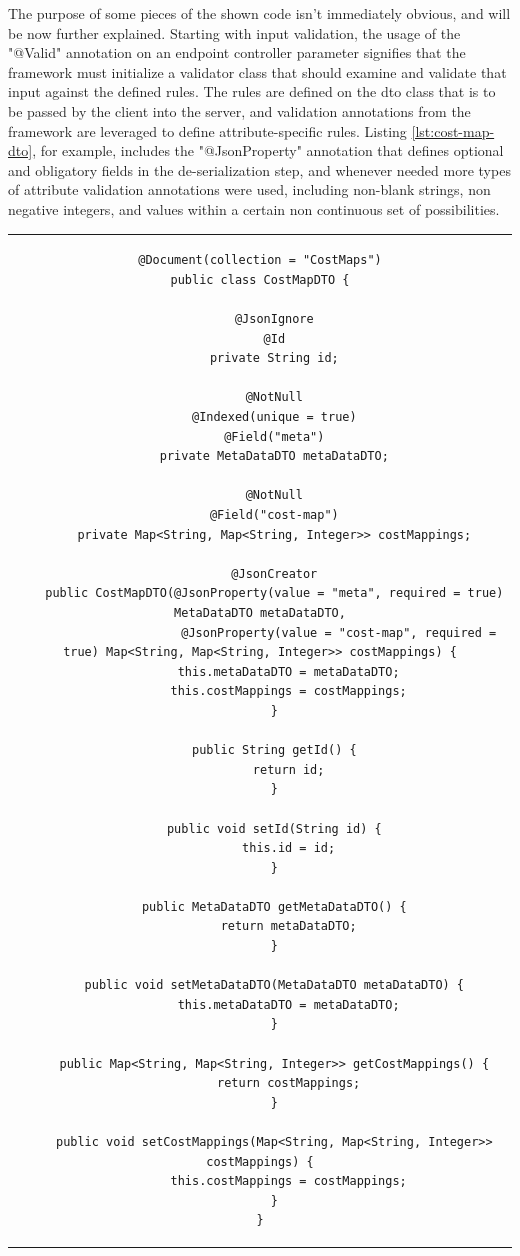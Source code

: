     The purpose of some pieces of the shown code isn't immediately obvious, and will be now further explained.
    Starting with input validation, the usage of the "@Valid" annotation on an endpoint controller parameter signifies that the framework must initialize a validator class that should examine and validate that input against the defined rules.
    The rules are defined on the \gls{dto} class that is to be passed by the client into the server, and validation annotations from the framework are leveraged to define attribute-specific rules.
    Listing \ref{lst:cost-map-dto}, for example, includes the "@JsonProperty" annotation that defines optional and obligatory fields in the de-serialization step, and whenever needed more types of attribute validation annotations were used, including non-blank strings, non negative integers, and values within a certain non continuous set of possibilities.

\begin{center}
\begin{tabular}{c}
\begin{lstlisting}[frame=tlrb, caption=Cost map DTO class, label={lst:cost-map-dto}, basicstyle=\tiny]
@Document(collection = "CostMaps")
public class CostMapDTO {

    @JsonIgnore
    @Id
    private String id;

    @NotNull
    @Indexed(unique = true)
    @Field("meta")
    private MetaDataDTO metaDataDTO;

    @NotNull
    @Field("cost-map")
    private Map<String, Map<String, Integer>> costMappings;

    @JsonCreator
    public CostMapDTO(@JsonProperty(value = "meta", required = true) MetaDataDTO metaDataDTO,
                      @JsonProperty(value = "cost-map", required = true) Map<String, Map<String, Integer>> costMappings) {
        this.metaDataDTO = metaDataDTO;
        this.costMappings = costMappings;
    }

    public String getId() {
        return id;
    }

    public void setId(String id) {
        this.id = id;
    }

    public MetaDataDTO getMetaDataDTO() {
        return metaDataDTO;
    }

    public void setMetaDataDTO(MetaDataDTO metaDataDTO) {
        this.metaDataDTO = metaDataDTO;
    }

    public Map<String, Map<String, Integer>> getCostMappings() {
        return costMappings;
    }

    public void setCostMappings(Map<String, Map<String, Integer>> costMappings) {
        this.costMappings = costMappings;
    }
}
\end{lstlisting}
\end{tabular}
\end{center}


